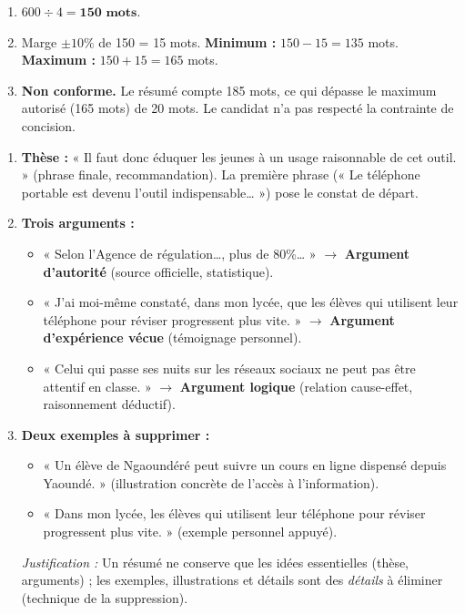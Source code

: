\documentclass[11pt]{article}
\newcommand{\cle}[1]{{\popxbold\color{popdark}#1}}
\begin{document}
\begin{corrige}
\begin{enumerate}
\item $600 \div 4 = \textbf{150 mots}$.
\item Marge $\pm 10\%$ de 150 = 15 mots. \textbf{Minimum :} $150 - 15 = 135$ mots. \textbf{Maximum :} $150 + 15 = 165$ mots.
\item \textbf{Non conforme.} Le résumé compte 185 mots, ce qui dépasse le maximum autorisé (165 mots) de 20 mots. Le candidat n'a pas respecté la contrainte de concision.
\end{enumerate}
\end{corrige}

\begin{corrige}
\begin{enumerate}
\item \textbf{Thèse :} « Il faut donc éduquer les jeunes à un usage raisonnable de cet outil. » (phrase finale, recommandation). La première phrase (« Le téléphone portable est devenu l'outil indispensable… ») pose le constat de départ.
\item \textbf{Trois arguments :}
\begin{itemize}
\item « Selon l'Agence de régulation…, plus de 80\%… » $\rightarrow$ \textbf{Argument d'autorité} (source officielle, statistique).
\item « J'ai moi-même constaté, dans mon lycée, que les élèves qui utilisent leur téléphone pour réviser progressent plus vite. » $\rightarrow$ \textbf{Argument d'expérience vécue} (témoignage personnel).
\item « Celui qui passe ses nuits sur les réseaux sociaux ne peut pas être attentif en classe. » $\rightarrow$ \textbf{Argument logique} (relation cause-effet, raisonnement déductif).
\end{itemize}
\item \textbf{Deux exemples à supprimer :}
\begin{itemize}
\item « Un élève de Ngaoundéré peut suivre un cours en ligne dispensé depuis Yaoundé. » (illustration concrète de l'accès à l'information).
\item « Dans mon lycée, les élèves qui utilisent leur téléphone pour réviser progressent plus vite. » (exemple personnel appuyé).
\end{itemize}
\textit{Justification :} Un résumé ne conserve que les idées essentielles (thèse, arguments) ; les exemples, illustrations et détails sont des \emph{détails} à éliminer (technique de la \cle{suppression}).

\end{enumerate}
\end{corrige}
\end{document}
